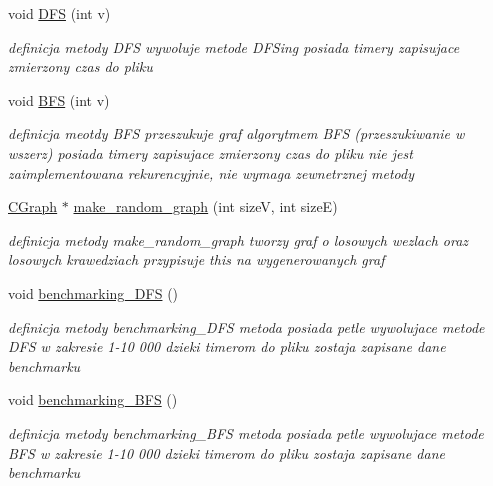 \begin{DoxyCompactItemize}
void \hyperlink{class_c_graph_a995e1f160b774b1d0c73dc1e3d6df5a4}{D\+F\+S} (int v)
\begin{DoxyCompactList}\small\item\em definicja metody D\+F\+S wywoluje metode D\+F\+Sing posiada timery zapisujace zmierzony czas do pliku \end{DoxyCompactList}\item 
void \hyperlink{class_c_graph_a7959dedbebc0e036672eae63e25e96eb}{B\+F\+S} (int v)
\begin{DoxyCompactList}\small\item\em definicja meotdy B\+F\+S przeszukuje graf algorytmem B\+F\+S (przeszukiwanie w wszerz) posiada timery zapisujace zmierzony czas do pliku nie jest zaimplementowana rekurencyjnie, nie wymaga zewnetrznej metody \end{DoxyCompactList}\item 
\hyperlink{class_c_graph}{C\+Graph} $\ast$ \hyperlink{class_c_graph_a9ad2c12f40800bede392b725d84e9981}{make\+\_\+random\+\_\+graph} (int size\+V, int size\+E)
\begin{DoxyCompactList}\small\item\em definicja metody make\+\_\+random\+\_\+graph tworzy graf o losowych wezlach oraz losowych krawedziach przypisuje this na wygenerowanych graf \end{DoxyCompactList}\item 
void \hyperlink{class_c_graph_ae563cd51fdf102a437cbb4046cb787e1}{benchmarking\+\_\+\+D\+F\+S} ()
\begin{DoxyCompactList}\small\item\em definicja metody benchmarking\+\_\+\+D\+F\+S metoda posiada petle wywolujace metode D\+F\+S w zakresie 1-\/10 000 dzieki timerom do pliku zostaja zapisane dane benchmarku \end{DoxyCompactList}\item 
void \hyperlink{class_c_graph_a4ea4a91e194bed6a21b7d9e5546fb47b}{benchmarking\+\_\+\+B\+F\+S} ()
\begin{DoxyCompactList}\small\item\em definicja metody benchmarking\+\_\+\+B\+F\+S metoda posiada petle wywolujace metode B\+F\+S w zakresie 1-\/10 000 dzieki timerom do pliku zostaja zapisane dane benchmarku \end{DoxyCompactList}\end{DoxyCompactItemize}
